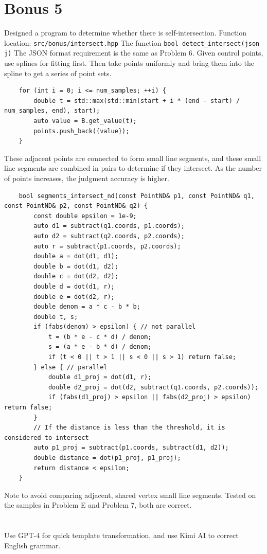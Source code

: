 \documentclass[a4paper]{article}
\begin{document}
\section*{Bonus 5}
Designed a program to determine whether there is self-intersection.
Function location: \texttt{src/bonus/intersect.hpp}
The function
\texttt{bool detect\_intersect(json j)}
The JSON format requirement is the same as Problem 6.
Given control points, use splines for fitting first.
Then take points uniformly and bring them into the spline to get a series of point sets.
\begin{verbatim}
    for (int i = 0; i <= num_samples; ++i) {
        double t = std::max(std::min(start + i * (end - start) / num_samples, end), start);
        auto value = B.get_value(t);
        points.push_back({value});
    }
\end{verbatim}
These adjacent points are connected to form small line segments, and these small line segments are combined in pairs to determine if they intersect.
As the number of points increases, the judgment accuracy is higher.
\begin{verbatim}
    bool segments_intersect_nd(const PointND& p1, const PointND& q1, const PointND& p2, const PointND& q2) {
        const double epsilon = 1e-9;
        auto d1 = subtract(q1.coords, p1.coords);
        auto d2 = subtract(q2.coords, p2.coords);
        auto r = subtract(p1.coords, p2.coords);
        double a = dot(d1, d1);
        double b = dot(d1, d2);
        double c = dot(d2, d2);
        double d = dot(d1, r);
        double e = dot(d2, r);
        double denom = a * c - b * b;
        double t, s;
        if (fabs(denom) > epsilon) { // not parallel
            t = (b * e - c * d) / denom;
            s = (a * e - b * d) / denom;   
            if (t < 0 || t > 1 || s < 0 || s > 1) return false;
        } else { // parallel
            double d1_proj = dot(d1, r);
            double d2_proj = dot(d2, subtract(q1.coords, p2.coords));
            if (fabs(d1_proj) > epsilon || fabs(d2_proj) > epsilon) return false;
        }
        // If the distance is less than the threshold, it is considered to intersect
        auto p1_proj = subtract(p1.coords, subtract(d1, d2));
        double distance = dot(p1_proj, p1_proj);
        return distance < epsilon;
    }
\end{verbatim}
Note to avoid comparing adjacent, shared vertex small line segments.
Tested on the samples in Problem E and Problem 7, both are correct.




\section*{  }
    Use GPT-4 for quick template transformation, and use Kimi AI to correct English grammar.
    
\end{document}
